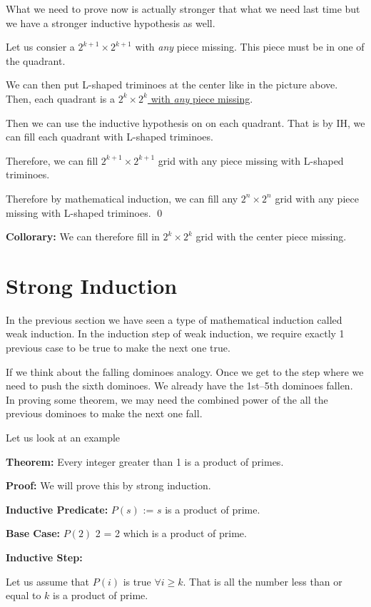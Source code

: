 \documentclass[a4paper, 12pt]{article}
\newcommand{\theorem}{\noindent\textbf{Theorem:} }
\newcommand{\predicate}{\noindent\textbf{Inductive Predicate:} }
\newcommand{\inductivestep}{\noindent\textbf{Inductive Step:} }
\renewcommand{\proof}{\noindent\textbf{Proof:} }
\newcommand{\basecase}{\noindent\textbf{Base Case:} }
\newcommand{\collorary}{\noindent\textbf{Collorary:} }
\newcommand{\qedd}{\qed\newline}
\theoremstyle{examplestyle}
\begin{document}
\begin{multicols}{2}
What we need to prove now is actually stronger that what we need last time but we have a stronger inductive hypothesis as well.

Let us consier a $2^{k+1} \times 2^{k+1}$ with \emph{any} piece missing. This piece must be in one of the quadrant.



We can then put L-shaped triminoes at the center like in the picture above. Then, each quadrant is a  \underline{$2^{k} \times 2^{k}$ with \emph{any} piece missing}.

Then we can use the inductive hypothesis on on each quadrant. That is by IH, we can fill each quadrant with L-shaped triminoes.

Therefore, we can fill $2^{k+1} \times 2^{k+1}$ grid with any piece missing with L-shaped triminoes.

Therefore by mathematical induction, we can fill any $2^n \times 2^n$ grid with any piece missing with L-shaped triminoes. \qedd

\collorary We can therefore fill in $2^k \times 2^k$ grid with the center piece missing.

\section*{Strong Induction}

In the previous section we have seen a type of mathematical induction called weak induction. In the induction step of weak induction, we require exactly 1 previous case to be true to make the next one true. 

If we think about the falling dominoes analogy. Once we get to the step where we need to push the sixth dominoes. We already have the 1st--5th dominoes fallen. In proving some theorem, we may need the combined power of the all the previous dominoes to make the next one fall.

Let us look at an example

\theorem Every integer greater than 1 is a product of primes.

\proof We will prove this by strong induction.

\predicate $P(s)$ := $s$ is a product of prime.

\basecase $P(2)$ 2 = 2 which is a product of prime.

\inductivestep

Let us assume that $P(i)$ is true $\forall i \ge k$. That is all the number less than or equal to $k$ is a product of prime.


\end{multicols}
\end{document}
